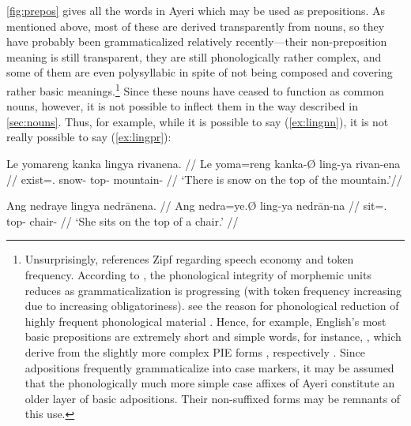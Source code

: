
\autoref{fig:prepos} gives all the words in Ayeri which may be used as 
prepositions. As mentioned above, most of these are derived transparently from 
nouns, so they have probably been grammaticalized relatively recently---their 
non-preposition meaning is still transparent, they are still phonologically 
rather complex, and some of them are even polysyllabic in spite of not being 
composed and covering rather basic meanings.\footnote{Unsurprisingly, 
\citet[129]{hagege2010} references Zipf regarding speech economy and token 
frequency. According to \citet[134--141]{lehmann2015}, the phonological 
integrity of morphemic units reduces as grammaticalization is progressing (with 
token frequency increasing due to increasing obligatoriness). 
\citet{bybeehopper2001b} see the reason for phonological reduction of highly 
frequent phonological material . Hence, for example, English's most basic prepositions 
are extremely short and simple words, for instance, , which 
derive from the slightly more complex PIE forms , 
respectively \citep[1, 39, 269]{kroonen2013}. Since adpositions frequently 
grammaticalize into case markers, it may be assumed that the phonologically much 
more simple case affixes of Ayeri constitute an older layer of basic 
adpositions. Their non-suffixed forms may be remnants of this use.} Since these 
nouns have ceased to function as common nouns, however, it is not possible to 
inflect them in the way described in \autoref{sec:nouns}. Thus, for example, 
while it is possible to say (\ref{ex:lingnn}), it is not really possible to say 
(\ref{ex:lingpr}):

\pex
\a\label{ex:lingnn}\begingl
	\gla Le yomareng kanka lingya rivanena. //
	\glb Le yoma=reng kanka-Ø ling-ya rivan-ena //
	\glc \PatTI{} exist=\TsgI{}.\Aarg{} snow-\Top{} top-\Loc{}
		mountain-\Gen{} //
	\glft `There is snow on the top of the mountain.'\footnotemark //
\endgl

\a\label{ex:lingpr}\ljudge* \begingl
	\gla Ang nedraye lingya nedrānena. //
	\glb Ang nedra=ye.Ø ling-ya nedrān-na //
	\glc \AgtT{} sit=\TsgF{}.\Top{} top-\Loc{} chair-\Gen{} //
	\glft `\ques{}She sits on the top of a chair.' //
\endgl


